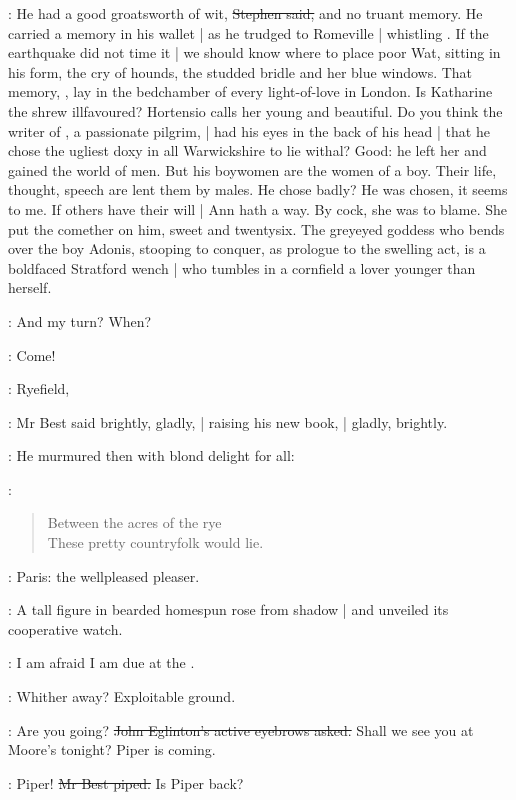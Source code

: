\Stephen:
He had a good groatsworth of wit,
\sout{Stephen said,}
and no truant memory.
He carried a memory in his wallet |
as he trudged to Romeville |
whistling .
If the earthquake did not time it |
we should know where to place poor Wat,
sitting in his form,
the cry of hounds,
the studded bridle and her blue windows.
That memory,
,
lay in the bedchamber of every light-of-love in London.
Is Katharine the shrew illfavoured?
Hortensio calls her young and beautiful.
Do you think the writer of ,
a passionate pilgrim, |
had his eyes in the back of his head |
that he chose the ugliest doxy in all Warwickshire to lie withal?
Good:
he left her and gained the world of men.
But his boywomen are the women of a boy.
Their life, thought, speech are lent them by males.
He chose badly?
He was chosen, it seems to me.
If others have their will |
Ann hath a way.
By cock, she was to blame.
She put the comether on him,
sweet and twentysix.
The greyeyed goddess who bends over the boy Adonis,
stooping to conquer,
as prologue to the swelling act,
is a boldfaced Stratford wench |
who tumbles in a cornfield
a lover younger than herself.

\StephenInt:
And my turn?
When?

\StephenInt:
Come!

\best:
Ryefield,

:
Mr Best said brightly, gladly, |
raising his new book, |
gladly, brightly.

:
He murmured then with blond delight for all:

\best:
\begin{verse}
    Between the acres of the rye \\
    These pretty countryfolk would lie.
\end{verse}

\StephenInt:
Paris:
the wellpleased pleaser.

:
A tall figure in bearded homespun rose from shadow |
and unveiled its cooperative watch.%

\AErussell:
I am afraid I am due at the .

\StephenInt:
Whither away?
Exploitable ground.

\eglinton:
Are you going?
\sout{John Eglinton's active eyebrows asked.}
Shall we see you at Moore's tonight?
Piper is coming.

\best:
Piper!
\sout{Mr Best piped.}
Is Piper back?

